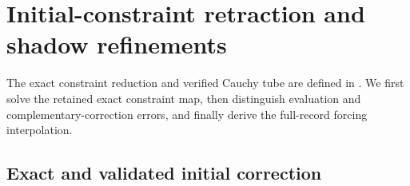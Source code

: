 \documentclass[11pt]{article}
\numberwithin{equation}{section}
\theoremstyle{definition}
\theoremstyle{remark}
\begin{document}
\section{Initial-constraint retraction and shadow refinements}
\label{app:initial-shadow-refinements}

The exact constraint reduction and verified Cauchy tube are defined in
. We first solve the retained exact
constraint map, then distinguish evaluation and complementary-correction
errors, and finally derive the full-record forcing interpolation.

\subsection{Exact and validated initial correction}
\end{document}
